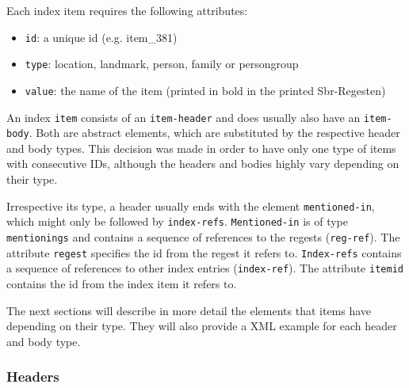 Each index item requires the following attributes: 
\begin{itemize}
\item \texttt{id}: a unique id (e.g. item\_381)
\item \texttt{type}: location, landmark, person, family or persongroup
\item \texttt{value}: the name of the item (printed in bold in the printed Sbr-Regesten)
\end{itemize}


An index \texttt{item} consists of an \texttt{item-header} and does usually also have an \texttt{item-body}. Both are abstract elements, which are substituted by the respective header and body types. This decision was made in order to have only one type of items with consecutive IDs, although the headers and bodies highly vary depending on their type.

Irrespective its type, a header usually ends with the element \texttt{mentioned-in}, which might only be followed by \texttt{index-refs}. \texttt{Mentioned-in} is of type \texttt{mentionings} and contains a sequence of references to the regests (\texttt{reg-ref}). The attribute \texttt{regest} specifies the id from the regest it refers to. \texttt{Index-refs} contains a sequence of references to other index entries (\texttt{index-ref}). The attribute \texttt{itemid} contains the id from the index item it refers to. 

The next sections will describe in more detail the elements that items have depending on their type. They will also provide a XML example for each header and body type.

\subsubsection{Headers}
\label{header-xml}

